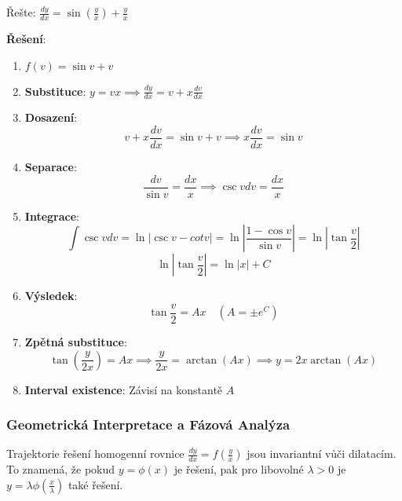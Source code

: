 \begin{example}
Řešte: $\frac{dy}{dx} = \sin\left(\frac{y}{x}\right) + \frac{y}{x}$
\vspace{0.3\baselineskip}

\textbf{Řešení}: 
\begin{enumerate}
\item $f(v) = \sin v + v$

\item \textbf{Substituce}: $y = vx \implies \frac{dy}{dx} = v + x\frac{dv}{dx}$

\item \textbf{Dosazení}:
\[
v + x\frac{dv}{dx} = \sin v + v \implies x\frac{dv}{dx} = \sin v
\]

\item \textbf{Separace}:
\[
\frac{dv}{\sin v} = \frac{dx}{x} \implies \csc v  dv = \frac{dx}{x}
\]

\item \textbf{Integrace}:
\[
\int \csc v  dv = \ln|\csc v - cot v| = \ln\left|\frac{1 - \cos v}{\sin v}\right| = \ln\left|\tan\frac{v}{2}\right|
\]
\[
\ln\left|\tan\frac{v}{2}\right| = \ln|x| + C
\]

\item \textbf{Výsledek}:
\[
\tan\frac{v}{2} = Ax \quad (A = \pm e^C)
\]

\item \textbf{Zpětná substituce}:
\[
\tan\left(\frac{y}{2x}\right) = Ax \implies \frac{y}{2x} = \arctan(Ax) \implies y = 2x \arctan(Ax)
\]

\item \textbf{Interval existence}: Závisí na konstantě $A$
\end{enumerate}
\end{example}

\vspace{0.8\baselineskip}

\subsubsection{Geometrická Interpretace a Fázová Analýza}
\label{subsubsec:geometricka-interpretace}

\begin{theorem}
Trajektorie řešení homogenní rovnice $\frac{dy}{dx} = f\left(\frac{y}{x}\right)$ jsou invariantní vůči dilatacím. To znamená, že pokud $y = \phi(x)$ je řešení, pak pro libovolné $\lambda > 0$ je $y = \lambda\phi\left(\frac{x}{\lambda}\right)$ také řešení.
\end{theorem}

